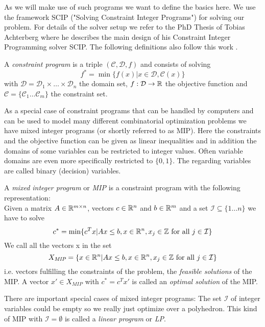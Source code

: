 As we will make use of such programs we want to define the basics here. We use the framework SCIP ("Solving Constraint 
Integer Programs") for solving our problem. For details of the solver setup we refer to the PhD Thesis of Tobias 
Achterberg \cite{Achterberg2007} where he describes the main design of his Constraint Integer Programming solver SCIP. 
The following definitions also follow this work \cite{Achterberg2007}.

\begin{definition}
 A \textit{constraint program} is a triple $(\mathcal{C},\mathcal{D},f)$ and consists of solving
 $$f^*=\min\{f(x)|x\in \mathcal{D}, \mathcal{C}(x)\}$$ 
 with $\mathcal{D}=\mathcal{D}_1\times \dots\times \mathcal{D}_n$ the domain set, $f:\mathcal{D}\to\mathbb{R}$ the objective 
function and $\mathcal{C}=\{\mathcal{C}_1\dots \mathcal{C}_m\}$ the constraint set.
\end{definition}

As a special case of constraint programs that can be handled by computers and can be used to model many different 
combinatorial optimization problems we have mixed integer programs (or shortly referred to as MIP). Here the 
constraints and the objective function can be given as linear inequalities and in addition the domains of some 
variables can be restricted to integer values. Often variable domains are even more specifically restricted to 
$\{0,1\}$. The regarding variables are called binary (decision) variables.

\begin{definition}
 A \textit{mixed integer program} or \textit{MIP} is a constraint program with the following representation:\\
 Given a matrix $A\in\mathbb{R}^{m\times n}$, vectors $c\in\mathbb{R}^n$ and $b\in \mathbb{R}^m$ and a set $\mathcal{I}\subseteq \{1\dots n\}$ 
 we have to solve
 $$c^*=\min\{c^T x|Ax\le b, x\in\mathbb{R}^n, x_j\in\mathbb{Z}\textrm{ for all }j\in\mathcal{I} \}$$
 We call all the vectors x in the set
 $$X_\textit{MIP}=\{x\in\mathbb{R}^n|A x\le b, x\in\mathbb{R}^n, x_j\in\mathbb{Z}\textrm{ for all }j\in\mathcal{I} \}$$
 i.e. vectors fulfilling the constraints of the problem, the \textit{feasible solutions} of the MIP. A vector $x'\in 
 X_\textit{MIP}$ with $c^*=c^Tx'$ is called an \textit{optimal solution} of the MIP.
\end{definition}

There are important special cases of mixed integer programs: The set $\mathcal{I}$ of integer variables could be empty 
so we really just optimize over a polyhedron. This kind of MIP with $\mathcal{I}=\emptyset$ is called a \textit{linear 
program} or \textit{LP}. 

